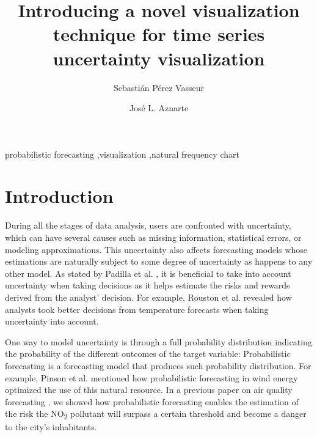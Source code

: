 \documentclass[a4paper,3p,sort&compress]{elsarticle}
\begin{document}
\linenumbers

\newcommand{\no}{NO\textsubscript{2}\xspace}
\newcommand{\ts}{\textsuperscript}

\begin{frontmatter}

  \title{Introducing a novel visualization technique for time series uncertainty visualization}


  \author{Sebasti\'an P\'erez Vasseur}
  \author{Jos\'e L. Aznarte}
  \address{Artificial Intelligence Department\\Universidad Nacional de
    Educaci\'on a Distancia --- UNED\\c/ Juan del Rosal, 16, Madrid, Spain}
  

\begin{abstract}
  
\end{abstract}

\begin{keyword}
probabilistic forecasting \sep visualization \sep natural frequency chart
\end{keyword}

\end{frontmatter}


\section{Introduction}
\label{sec:intro}

During all the stages of data analysis, users are confronted with uncertainty, which can have 
several causes such as missing information, statistical errors, or modeling approximations.
This uncertainty also affects forecasting models whose estimations are naturally 
subject to some degree of uncertainty as happens to any other model. 
As stated by Padilla et al. \cite{padilla_uncertainty_2021}, it is beneficial to take into account uncertainty 
when taking decisions as it helps estimate the risks and rewards derived from the analyst'
decision. For example, Rouston et al. \cite{roulston_laboratory_2006} 
revealed how analysts 
took better decisions from temperature forecasts when taking uncertainty into account. 

One way to model uncertainty is through a full 
probability distribution indicating the probability of the different outcomes of the target variable:
Probabilistic forecasting is a forecasting model that produces such probability distribution.
For example, Pinson et al. \cite{pinson_non-parametric_2007} mentioned how probabilistic forecasting 
in wind energy optimized the use of this natural resource. In a previous paper on air quality forecasting 
\cite{vasseur_comparing_2021}, we showed 
how probabilistic forecasting enables the estimation of the risk the \no pollutant will surpass a certain threshold 
and become a danger to the city's inhabitants. 
\end{document}

